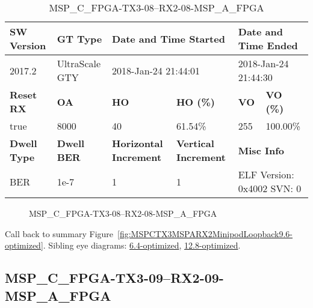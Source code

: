 \begin{table}[h]
\centering
\caption{MSP\_C\_FPGA-TX3-08--RX2-08-MSP\_A\_FPGA}
\label{tab:MSPCFPGATX308RX208MSPAFPGA9.6-optimized}
\begin{tabular}{@{}|l|l|l|l|l|l|@{}}
\toprule
\textbf{SW Version}                & \textbf{GT Type}   & \multicolumn{2}{l|}{\textbf{Date and Time Started}}            & \multicolumn{2}{l|}{\textbf{Date and Time Ended}}        \\ \midrule
2017.2                       & UltraScale GTY          & \multicolumn{2}{l|}{2018-Jan-24 21:44:01}                   & \multicolumn{2}{l|}{2018-Jan-24 21:44:30}               \\ \midrule
\textbf{Reset RX}                  & \textbf{OA} & \textbf{HO}   & \textbf{HO (\%)} & \textbf{VO} & \textbf{VO (\%)} \\ \midrule
true & 8000        & 40          & 61.54\%        & 255        & 100.00\%       \\ \midrule
\textbf{Dwell Type}                & \textbf{Dwell BER} & \textbf{Horizontal Increment} & \textbf{Vertical Increment}    & \multicolumn{2}{l|}{\textbf{Misc Info}}                  \\ \midrule
BER                            & 1e-7        & 1        & 1           & \multicolumn{2}{l|}{ELF Version: 0x4002 SVN: 0}                         \\ \bottomrule
\end{tabular}
\end{table}

\begin{figure}[h]
\caption{MSP\_C\_FPGA-TX3-08--RX2-08-MSP\_A\_FPGA} \label{fig:MSPCFPGATX308RX208MSPAFPGA9.6-optimized}
\end{figure}

Call back to summary Figure~\ref{fig:MSPCTX3MSPARX2MinipodLoopback9.6-optimized}.
Sibling eye diagrams: \hyperref[sec:MSPCFPGATX308RX208MSPAFPGA6.4-optimized]{6.4-optimized}, \hyperref[sec:MSPCFPGATX308RX208MSPAFPGA12.8-optimized]{12.8-optimized}.

\clearpage
\newpage


\subsection{MSP\_C\_FPGA-TX3-09--RX2-09-MSP\_A\_FPGA}\label{sec:MSPCFPGATX309RX209MSPAFPGA9.6-optimized}

